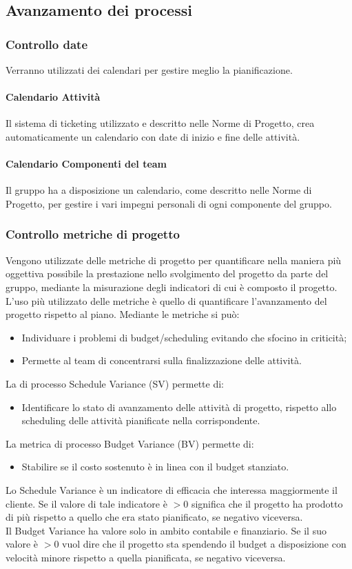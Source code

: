 \subsection{Avanzamento dei processi}
\subsubsection{Controllo date}
Verranno utilizzati dei calendari per gestire meglio la pianificazione.
\paragraph{Calendario Attività}
Il sistema di ticketing utilizzato e descritto nelle Norme di Progetto, crea automaticamente un calendario con date di inizio e fine delle attività.
\paragraph{Calendario Componenti del team}
Il gruppo ha a disposizione un calendario, come descritto nelle Norme di Progetto, per gestire i vari impegni personali di ogni componente del gruppo.
\subsubsection{Controllo metriche di progetto}
Vengono utilizzate delle metriche di progetto per quantificare nella maniera più oggettiva possibile la prestazione nello svolgimento del progetto da parte del gruppo, mediante la misurazione degli indicatori di cui è composto il progetto. L'uso più utilizzato delle metriche è quello di quantificare l'avanzamento del progetto rispetto al piano. Mediante le metriche si può:
\begin{itemize}
\item Individuare i problemi di budget/scheduling evitando che sfocino in criticità;
\item Permette al team di concentrarsi sulla finalizzazione delle attività.
\end{itemize}
La  di processo Schedule Variance (SV) permette di:
\begin{itemize}
\item Identificare lo stato di avanzamento delle attività di progetto,  rispetto allo scheduling delle attività pianificate nella  corrispondente.
\end{itemize}
La metrica di processo Budget Variance (BV) permette di:
\begin{itemize}
\item Stabilire se il costo sostenuto è in linea con il budget stanziato.
\end{itemize}
Lo Schedule Variance è un indicatore di efficacia che interessa maggiormente il cliente. Se il valore di tale indicatore è $>{0}$ significa che il progetto ha prodotto di più rispetto a quello che era stato pianificato, se negativo viceversa.\\
Il Budget Variance ha valore solo in ambito contabile e finanziario. Se il suo valore è $>{0}$ vuol dire che il progetto sta spendendo il budget a disposizione con velocità minore rispetto a quella pianificata, se negativo viceversa.

